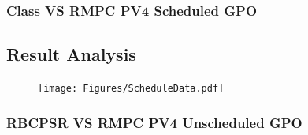 \documentclass{beamer}
\begin{document}
        

\begin{frame}
\frametitle{Class VS RMPC PV4 Scheduled GPO}
\subsection{Result Analysis}

\begin{figure}[!ht]
        \begin{center}
                \texttt{[image: Figures/ScheduleData.pdf]}
        \end{center}
        \end{figure}
\end{frame}


\begin{frame}
\frametitle{RBCPSR VS RMPC PV4 Unscheduled GPO}

\end{frame}
\end{document}
